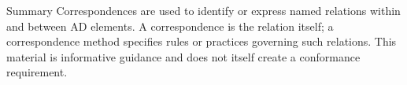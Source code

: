 \documentclass[10pt,letterpaper]{article}
\begin{document}
\begin{CornellSummaryBox}{Summary}
Correspondences are used to identify or express named relations within and between AD elements. A correspondence is the relation itself; a correspondence method specifies rules or practices governing such relations. This material is informative guidance and does not itself create a conformance requirement.
\end{CornellSummaryBox}
\end{document}
